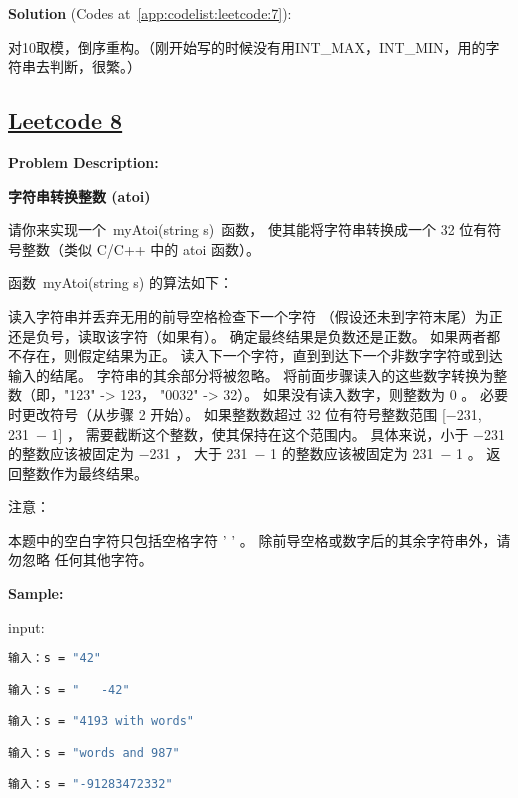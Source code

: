 \textbf{Solution }(Codes at~\ref{app:codelist:leetcode:7}):\par

对10取模，倒序重构。（刚开始写的时候没有用INT\_MAX，INT\_MIN，用的字符串去判断，很繁。）\par



\subsection{\href{https://leetcode-cn.com/}{Leetcode 8}}\label{app:problemlist:leetcode:8}

\textbf{Problem Description:}\par

\textbf{字符串转换整数 (atoi)}\par

请你来实现一个 myAtoi(string s) 函数，
使其能将字符串转换成一个 32 位有符号整数（类似 C/C++ 中的 atoi 函数）。\par

函数 myAtoi(string s) 的算法如下：\par

读入字符串并丢弃无用的前导空格检查下一个字符
（假设还未到字符末尾）为正还是负号，读取该字符（如果有）。 
确定最终结果是负数还是正数。 
如果两者都不存在，则假定结果为正。
读入下一个字符，直到到达下一个非数字字符或到达输入的结尾。
字符串的其余部分将被忽略。
将前面步骤读入的这些数字转换为整数（即，"123" -> 123， "0032" -> 32）。
如果没有读入数字，则整数为 0 。
必要时更改符号（从步骤 2 开始）。
如果整数数超过 32 位有符号整数范围 [−231,  231 − 1] ，
需要截断这个整数，使其保持在这个范围内。
具体来说，小于 −231 的整数应该被固定为 −231 ，
大于 231 − 1 的整数应该被固定为 231 − 1 。
返回整数作为最终结果。\par

注意：\par

本题中的空白字符只包括空格字符 ' ' 。
除前导空格或数字后的其余字符串外，请勿忽略 任何其他字符。\par



\textbf{Sample:}\par

input:\par

\begin{lstlisting}[language=bash]
输入：s = "42"

输入：s = "   -42"

输入：s = "4193 with words"

输入：s = "words and 987"

输入：s = "-91283472332"
\end{lstlisting}

